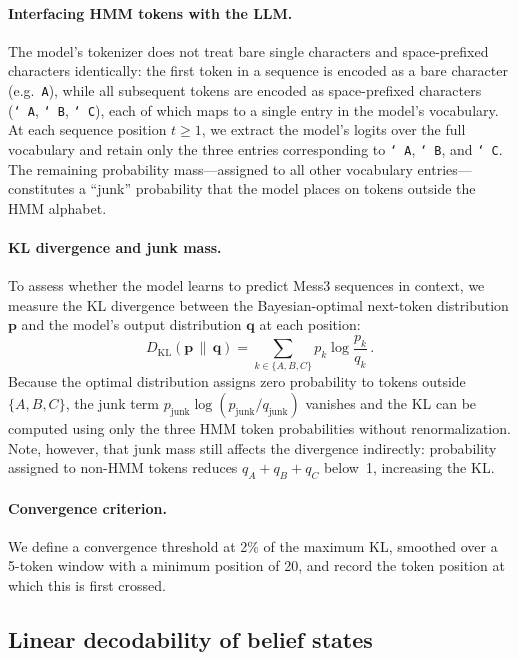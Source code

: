 \documentclass[midterm]{sparreport}
\begin{document}
\paragraph{Interfacing HMM tokens with the LLM.}
The model's tokenizer does not treat bare single characters and space-prefixed characters identically: the first token in a sequence is encoded as a bare character (e.g.\ \texttt{A}), while all subsequent tokens are encoded as space-prefixed characters (\texttt{{\char`\ }A}, \texttt{{\char`\ }B}, \texttt{{\char`\ }C}), each of which maps to a single entry in the model's vocabulary. At each sequence position $t \geq 1$, we extract the model's logits over the full vocabulary and retain only the three entries corresponding to \texttt{{\char`\ }A}, \texttt{{\char`\ }B}, and \texttt{{\char`\ }C}. The remaining probability mass---assigned to all other vocabulary entries---constitutes a ``junk'' probability that the model places on tokens outside the HMM alphabet.

\paragraph{KL divergence and junk mass.}
To assess whether the model learns to predict Mess3 sequences in context, we measure the KL divergence between the Bayesian-optimal next-token distribution $\mathbf{p}$ and the model's output distribution $\mathbf{q}$ at each position:
\[
  D_{\mathrm{KL}}(\mathbf{p} \,\|\, \mathbf{q})
  = \sum_{k \in \{A,B,C\}} p_k \log \frac{p_k}{q_k}\,.
\]
Because the optimal distribution assigns zero probability to tokens outside $\{A,B,C\}$, the junk term $p_{\text{junk}} \log(p_{\text{junk}} / q_{\text{junk}})$ vanishes and the KL can be computed using only the three HMM token probabilities without renormalization. Note, however, that junk mass still affects the divergence indirectly: probability assigned to non-HMM tokens reduces $q_A + q_B + q_C$ below~1, increasing the KL.

\paragraph{Convergence criterion.}
We define a convergence threshold at 2\% of the maximum KL, smoothed over a 5-token window with a minimum position of 20, and record the token position at which this is first crossed.

\subsection{Linear decodability of belief states}
\label{sec:linear_decodability}
\end{document}
